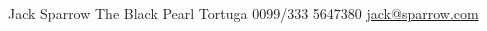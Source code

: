 \documentclass[lighthipster]{simplehipstercv}
\newlength{\rightcolwidth}
\begin{document}
\begin{paracol}{2}
\vfill{} %

\setlength{\parindent}{0pt}
\begin{minipage}[t]{\rightcolwidth}
\begin{center}\fontfamily{\sfdefault}\selectfont \color{black!70}
{\small Jack Sparrow  The Black Pearl  Tortuga  0099/333 5647380 \newline{} \protect\url{jack@sparrow.com}
}
\end{center}
\end{minipage}

\end{paracol}
\end{document}

